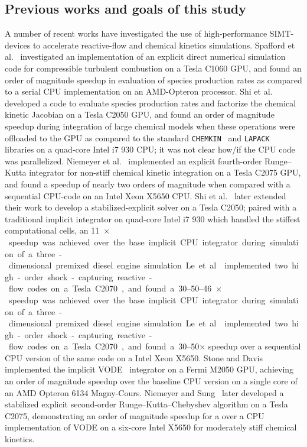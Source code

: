 \documentclass[12pt,number,sort&compress,preprint]{elsarticle}
\begin{document}
\subsection{Previous works and goals of this study}
A number of recent works have investigated the use of high-performance SIMT-devices to accelerate reactive-flow and chemical kinetics simulations.
Spafford et al.~\cite{Spafford:2010aa} investigated an implementation of an explicit direct numerical simulation code for compressible turbulent combustion on a Tesla C1060 GPU, and found an order of magnitude speedup in evaluation of species production rates as compared to a serial CPU implementation on an AMD-Opteron processor.
Shi et al.~\cite{Shi:2011aa} developed a code to evaluate species production rates and factorize the chemical kinetic Jacobian on a Tesla C2050 GPU, and found an order of magnitude speedup during integration of large chemical models when these operations were offloaded to the GPU as compared to the standard \texttt{CHEMKIN}~\cite{kee1989chemkin} and \texttt{LAPACK}~\cite{Anderson:1999aa} libraries on a quad-core Intel i7 930 CPU; it was not clear how\slash if the CPU code was parallelized.
Niemeyer et al.~\cite{Niemeyer:2011aa} implemented an explicit fourth-order Runge--Kutta integrator for non-stiff chemical kinetic integration on a Tesla C2075 GPU, and found a speedup of nearly two orders of magnitude when compared with a sequential CPU-code on an Intel Xeon X5650 CPU.
Shi et al.~\cite{Shi:2012aa} later extended their work to develop a stabilized-explicit solver on a Tesla C2050; paired with a traditional implicit integrator on quad-core Intel i7 930 which handled the stiffest computational cells, an \SIrange{11}{46}{$\times$} speedup was achieved over the base implicit CPU integrator during simulation of a three-dimensional premixed diesel engine simulation.
Le et al.~\cite{Le2013596} implemented two high-order shock-capturing reactive-flow codes on a Tesla C2070, and found a \numrange{30}{50}$\times$ speedup over a sequential CPU version of the same code on a Intel Xeon X5650.
Stone and Davis~\cite{Stone:2013aa} implemented the implicit VODE~\cite{Brown:1989vl} integrator on a Fermi M2050 GPU, achieving an order of magnitude speedup over the baseline CPU version on a single core of an AMD Opteron 6134 Magny-Cours.
Niemeyer and Sung~\cite{Niemeyer:2014aa} later developed a stabilized explicit second-order Runge--Kutta--Chebyshev algorithm on a Tesla C2075, demonstrating an order of magnitude speedup for a over a CPU implementation of VODE on a six-core Intel X5650 for moderately stiff chemical kinetics.
\end{document}
